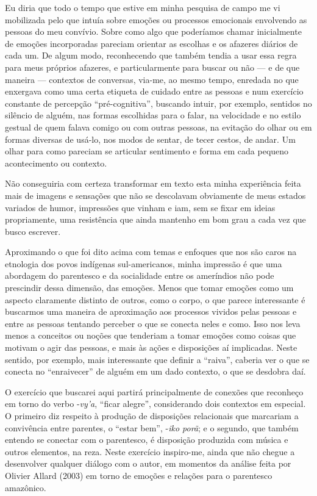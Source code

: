 Eu diria que todo o tempo que estive em minha pesquisa de campo me vi
mobilizada pelo que intuía sobre emoções ou processos emocionais
envolvendo as pessoas do meu convívio. Sobre como algo que poderíamos
chamar inicialmente de emoções incorporadas pareciam orientar as
escolhas e os afazeres diários de cada um. De algum modo, reconhecendo
que também tendia a usar essa regra para meus próprios afazeres, e
particularmente para buscar ou não --- e de que maneira --- contextos de
conversas, via-me, ao mesmo tempo, enredada no que enxergava como uma
certa etiqueta de cuidado entre as pessoas e num exercício constante de
percepção ``pré-cognitiva'', buscando intuir, por exemplo, sentidos no
silêncio de alguém, nas formas escolhidas para o falar, na velocidade e
no estilo gestual de quem falava comigo ou com outras pessoas, na
evitação do olhar ou em formas diversas de usá-lo, nos modos de sentar,
de tecer cestos, de andar. Um olhar para como pareciam se articular
sentimento e forma em cada pequeno acontecimento ou contexto.

Não conseguiria com certeza transformar em texto esta minha experiência
feita mais de imagens e sensações que não se descolavam obviamente de
meus estados variados de humor, impressões que vinham e iam, sem se
fixar em ideias propriamente, uma resistência que ainda mantenho em bom
grau a cada vez que busco escrever.

Aproximando o que foi dito acima com temas e enfoques que nos são caros
na etnologia dos povos indígenas sul-americanos, minha impressão é que
uma abordagem do parentesco e da socialidade entre os ameríndios não
pode prescindir dessa dimensão, das emoções. Menos que tomar emoções
como um aspecto claramente distinto de outros, como o corpo, o que
parece interessante é buscarmos uma maneira de aproximação aos processos
vividos pelas pessoas e entre as pessoas tentando perceber o que se
conecta neles e como. Isso nos leva menos a conceitos ou noções que
tenderiam a tomar emoções como coisas que motivam o agir das pessoas, e
mais às ações e disposições aí implicadas. Neste sentido, por exemplo,
mais interessante que definir a ``raiva'', caberia ver o que se conecta
no ``enraivecer'' de alguém em um dado contexto, o que se desdobra daí.

O exercício que buscarei aqui partirá principalmente de conexões que
reconheço em torno do verbo -\emph{vy'a}, ``ficar alegre'', considerando
dois contextos em especial. O primeiro diz respeito à produção de
disposições relacionais que marcariam a convivência entre parentes, o
``estar bem'', -\emph{iko porã}; e o segundo, que também entendo se
conectar com o parentesco, é disposição produzida com música e outros
elementos, na reza. Neste exercício inspiro-me, ainda que não chegue a
desenvolver qualquer diálogo com o autor, em momentos da análise feita
por Olivier Allard (2003) em torno de emoções e relações para o
parentesco amazônico.

